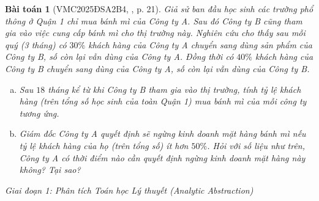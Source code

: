 \documentclass{article}
\newtheorem{baitoan}{Bài toán}
\begin{document}
\begin{baitoan}[VMC2025ĐSA2B4, \cite{VMS_VMC2025}, p. 21]
	Giả sử ban đầu học sinh các trường phổ thông ở Quận 1 chỉ mua bánh mì của Công ty A. Sau đó Công ty B cũng tham gia vào việc cung cấp bánh mì cho thị trường này. Nghiên cứu cho thấy sau mỗi quý (3 tháng) có $30\%$ khách hàng của Công ty A chuyển sang dùng sản phẩm của Công ty B, số còn lại vẫn dùng của Công ty A. Đồng thời có $40\%$ khách hàng của Công ty B chuyển sang dùng của Công ty A, số còn lại vẫn dùng của Công ty B.
	\begin{enumerate}[(a)]
		\item Sau $18$ tháng kể từ khi Công ty B tham gia vào thị trường, tính tỷ lệ khách hàng (trên tổng số học sinh của toàn Quận 1) mua bánh mì của mỗi công ty tương ứng.
		\item Giám đốc Công ty A quyết định sẽ ngừng kinh doanh mặt hàng bánh mì nếu tỷ lệ khách hàng của họ (trên tổng số) ít hơn $50\%$. Hỏi với số liệu như trên, Công ty A có thời điểm nào cần quyết định ngừng kinh doanh mặt hàng này không? Tại sao?
	\end{enumerate}
\end{baitoan}

\vspace{0.5em}\noindent\emph{Giai đoạn 1: Phân tích Toán học Lý thuyết (Analytic Abstraction)}
\end{document}
